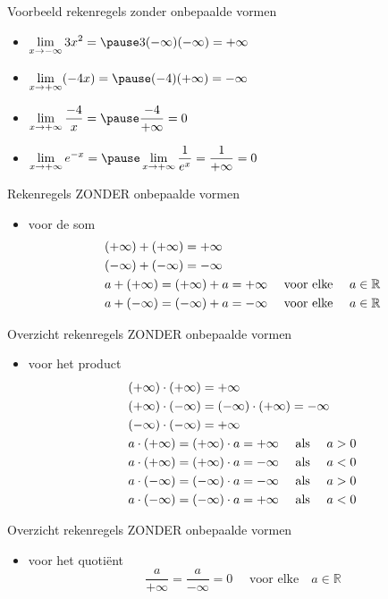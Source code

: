 \documentclass[handout]{beamer}
\newcommand{\ds}{\displaystyle}
\begin{document}
\begin{frame}{Voorbeeld rekenregels zonder onbepaalde vormen}
\begin{itemize}
\item $\ds \lim_{x \rightarrow - \infty} 3 x^2 = \pause 3(- \infty)(- \infty) = + \infty$
\item $\ds \lim_{x \rightarrow + \infty} (-4x)= \pause (-4)(+ \infty)= - \infty$
\item $\ds \lim_{x \rightarrow + \infty} \frac{-4}{x} = \pause \frac{-4}{+ \infty}=0$
\item $\ds \lim_{x \rightarrow + \infty} e^{-x} = \pause \lim_{x \rightarrow + \infty} \frac{1}{e^x} = \frac{1}{+ \infty} = 0$
\end{itemize}
\end{frame}

\begin{frame}{Rekenregels ZONDER onbepaalde vormen}
\begin{itemize}
\item voor de som
\[\aligned
& (+ \infty) + (+ \infty) = + \infty \\
& (- \infty) + (-\infty) = - \infty \\
& a + (+ \infty) = (+ \infty) + a = + \infty \quad \text { voor elke
} \quad a
\in \mathbb{R} \\
& a + (- \infty) = (-\infty) + a = - \infty \quad \text { voor elke } \quad a
\in \mathbb{R} \\
\endaligned
\]
\end{itemize}
\end{frame}
\begin{frame}{Overzicht rekenregels ZONDER onbepaalde vormen}
\begin{itemize}
\item voor het product
\[\aligned
& (+ \infty) \cdot (+ \infty) = + \infty\\
& (+ \infty) \cdot (-\infty) = (-\infty) \cdot (+ \infty) = - \infty \\
& (-\infty) \cdot (-\infty) = + \infty   \\
& a \cdot (+ \infty) = (+ \infty) \cdot a = + \infty \quad \text {
als } \quad a
> 0 \\
& a \cdot (+ \infty) = (+ \infty) \cdot a = - \infty \quad \text { als } \quad a
< 0 \\
& a \cdot (- \infty) = (- \infty) \cdot a = - \infty \quad \text { als } \quad a
> 0 \\
& a \cdot (- \infty) = (- \infty) \cdot a = + \infty \quad \text { als } \quad a
< 0 \\
\endaligned
\]

\end{itemize}
\end{frame}
\begin{frame}{Overzicht rekenregels ZONDER onbepaalde vormen}
\begin{itemize}
	\item voor het quoti\"ent
	$$\frac{a}{+ \infty} = \frac{a}{-\infty} = 0 \quad \text { voor elke
} \quad a \in \mathbb{R}$$
\end{itemize}
\end{frame}
\end{document}
